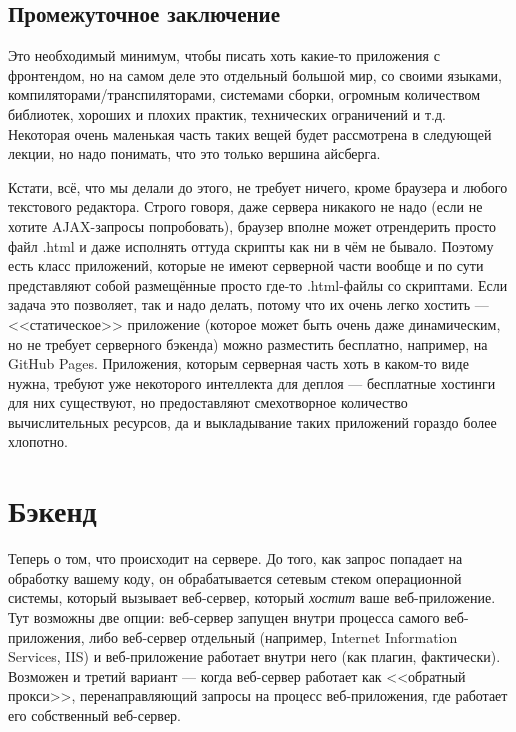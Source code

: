 \documentclass{../../text-style}
\begin{document}
\subsection{Промежуточное заключение}

Это необходимый минимум, чтобы писать хоть какие-то приложения с фронтендом, но на самом деле это отдельный большой мир, со своими языками, компиляторами/транспиляторами, системами сборки, огромным количеством библиотек, хороших и плохих практик, технических ограничений и т.д. Некоторая очень маленькая часть таких вещей будет рассмотрена в следующей лекции, но надо понимать, что это только вершина айсберга.

Кстати, всё, что мы делали до этого, не требует ничего, кроме браузера и любого текстового редактора. Строго говоря, даже сервера никакого не надо (если не хотите AJAX-запросы попробовать), браузер вполне может отрендерить просто файл .html и даже исполнять оттуда скрипты как ни в чём не бывало. Поэтому есть класс приложений, которые не имеют серверной части вообще и по сути представляют собой размещённые просто где-то .html-файлы со скриптами. Если задача это позволяет, так и надо делать, потому что их очень легко хостить --- <<статическое>> приложение (которое может быть очень даже динамическим, но не требует серверного бэкенда) можно разместить бесплатно, например, на GitHub Pages. Приложения, которым серверная часть хоть в каком-то виде нужна, требуют уже некоторого интеллекта для деплоя --- бесплатные хостинги для них существуют, но предоставляют смехотворное количество вычислительных ресурсов, да и выкладывание таких приложений гораздо более хлопотно.

\section{Бэкенд}

Теперь о том, что происходит на сервере. До того, как запрос попадает на обработку вашему коду, он обрабатывается сетевым стеком операционной системы, который вызывает веб-сервер, который \emph{хостит} ваше веб-приложение. Тут возможны две опции: веб-сервер запущен внутри процесса самого веб-приложения, либо веб-сервер отдельный (например, Internet Information Services, IIS) и веб-приложение работает внутри него (как плагин, фактически). Возможен и третий вариант --- когда веб-сервер работает как <<обратный прокси>>, перенаправляющий запросы на процесс веб-приложения, где работает его собственный веб-сервер.
\end{document}
